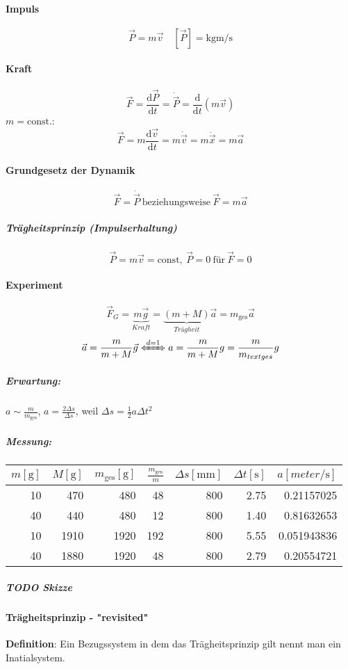\documentclass[a4paper]{scrartcl}
\renewcommand{\d}{\mathrm{d}}
\newcommand{\f}[2]{{\frac{#1}{#2}}}
\renewcommand{\v}[1]{\vec{#1}}
\theoremstyle{definition}
\theoremstyle{plain}
\theoremstyle{plain}
\theoremstyle{remark}
\theoremstyle{remark}
\theoremstyle{remark}
\begin{document}
\paragraph{Impuls}
\label{sec-2-2-1-1}
\[\v P = m\v v\quad [\v P] = \si{\kg\meter\per\second}\]
\paragraph{Kraft}
\label{sec-2-2-1-2}
\[\v F = \f{\d\v P}{\d t} = \dot{\v P} = \f{\d}{\d t}(m\v v)\]
$m = \text{const.}$:
\[\v F = m \f{\d\v v}{\d t} = m\dot{\v v} = m\ddot{\v x} = m\v a\]
\paragraph{Grundgesetz der Dynamik}
\label{sec-2-2-1-3}
\[\v F = \dot{\v P}~\text{beziehungsweise}~\v F = m\v a\]
\subparagraph{Trägheitsprinzip (Impulserhaltung)}
\label{sec-2-2-1-3-1}
\[\v P = m\v v = \text{const},~\v P = 0~\text{für}~\v F = 0\]
\paragraph{Experiment}
\label{sec-2-2-1-4}
\[\v F_G = \underbrace{m\v g}_{Kraft} = \underbrace{(m + M)}_{Trägheit}\v a = m_{\text{ges}}\v a\]
\[\v a = \f{m}{m + M}\v g \xLeftrightarrow{d = 1} a = \f{m}{m + M}g = \f{m}{m_{text{ges}}}g\]
\subparagraph{Erwartung:}
\label{sec-2-2-1-4-1}
$a\sim {\f{m}{m_{\text{ges}}}}$, $a = \f{2\Delta s}{\Delta s}$, weil $\Delta s = \f{1}{2} a\Delta t^2$
\subparagraph{Messung:}
\label{sec-2-2-1-4-2}
\begin{center}
\begin{tabular}{rrrrrrr}
$m[\si{\gram}]$ & $M[\si{\gram}]$ & $m_{\text{ges}}[\si{\gram}]$ & $\f{m_{\text{ges}}}{m}$ & $\Delta s[\si{\mm}]$ & $\Delta t [\si{\second}]$ & $a[\si{meter\per\second}]$\\
\hline
10 & 470 & 480 & 48 & 800 & 2.75 & 0.21157025\\
40 & 440 & 480 & 12 & 800 & 1.40 & 0.81632653\\
10 & 1910 & 1920 & 192 & 800 & 5.55 & 0.051943836\\
40 & 1880 & 1920 & 48 & 800 & 2.79 & 0.20554721\\
\end{tabular}
\end{center}
\subparagraph{{\bfseries\sffamily TODO} Skizze}
\label{sec-2-2-1-4-3}
\paragraph{Trägheitsprinzip - "revisited"}
\label{sec-2-2-1-5}
\textbf{Definition}: Ein Bezugssystem in dem das Trägheitsprinzip gilt nennt man ein Inatialsystem. \\
\end{document}

